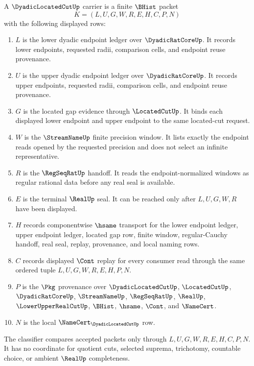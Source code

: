 \begin{definition}
\label{def:dyadic-located-cut-carrier}
A $\DyadicLocatedCutUp$ carrier is a finite $\BHist$ packet
$$
K=(L,U,G,W,R,E,H,C,P,N)
$$
with the following displayed rows:
\begin{enumerate}
\item $L$ is the lower dyadic endpoint ledger over $\DyadicRatCoreUp$. It records lower endpoints, requested radii, comparison cells, and endpoint reuse provenance.
\item $U$ is the upper dyadic endpoint ledger over $\DyadicRatCoreUp$. It records upper endpoints, requested radii, comparison cells, and endpoint reuse provenance.
\item $G$ is the located gap evidence through $\LocatedCutUp$. It binds each displayed lower endpoint and upper endpoint to the same located-cut request.
\item $W$ is the $\StreamNameUp$ finite precision window. It lists exactly the endpoint reads opened by the requested precision and does not select an infinite representative.
\item $R$ is the $\RegSeqRatUp$ handoff. It reads the endpoint-normalized windows as regular rational data before any real seal is available.
\item $E$ is the terminal $\RealUp$ seal. It can be reached only after $L,U,G,W,R$ have been displayed.
\item $H$ records componentwise $\hsame$ transport for the lower endpoint ledger, upper endpoint ledger, located gap row, finite window, regular-Cauchy handoff, real seal, replay, provenance, and local naming rows.
\item $C$ records displayed $\Cont$ replay for every consumer read through the same ordered tuple $L,U,G,W,R,E,H,P,N$.
\item $P$ is the $\Pkg$ provenance over $\DyadicLocatedCutUp$, $\LocatedCutUp$, $\DyadicRatCoreUp$, $\StreamNameUp$, $\RegSeqRatUp$, $\RealUp$, $\LowerUpperRealCutUp$, $\BHist$, $\hsame$, $\Cont$, and $\NameCert$.
\item $N$ is the local $\NameCert_{\DyadicLocatedCutUp}$ row.
\end{enumerate}
The classifier compares accepted packets only through $L,U,G,W,R,E,H,C,P,N$. It has no coordinate for quotient cuts, selected suprema, trichotomy, countable choice, or ambient $\RealUp$ completeness.
\end{definition}

